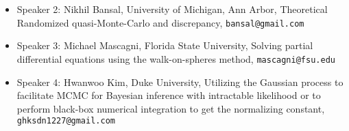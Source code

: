 \begin{talk}
\begin{itemize}
\item Speaker 2: Nikhil Bansal, University of Michigan, Ann Arbor, Theoretical Randomized quasi-Monte-Carlo and discrepancy, \texttt{bansal@gmail.com}
    
\item Speaker 3: Michael Mascagni, Florida State University, Solving partial differential equations using the walk-on-spheres method, \texttt{mascagni@fsu.edu}
    
\item Speaker 4: Hwanwoo Kim, Duke University, Utilizing the Gaussian process to facilitate MCMC for Bayesian inference with intractable likelihood or to perform black-box numerical integration to get the normalizing constant, \texttt{ghksdn1227@gmail.com}
\end{itemize}



\begin{comment}
If you would like to include references, please do so by creating a simple list numbered by [1], [2], [3], \ldots. See example below.
Please do not use the \texttt{bibliography} environment or \texttt{bibtex} files.
\begin{enumerate}
	
\item[{[1]}] Niederreiter, Harald (1992). {\it Random number generation and quasi-Monte Carlo methods}. Society for Industrial and Applied Mathematics (SIAM).
	
\item[{[2]}] Roberts, Gareth O, \& Rosenthal, Jeffrey S. (2002).  Optimal scaling for various Metropolis-Hastings algorithms, \textbf{16}(4), 351--367.
\end{enumerate}

Equations may be used if they are referenced. Please note that the equation numbers may be different (but will be cross-referenced correctly) in the final program book.
\end{comment}
\end{talk}

